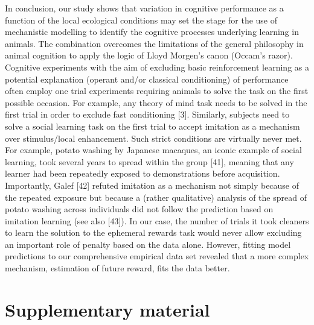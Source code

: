 \documentclass[10pt,letterpaper]{article}
\newcommand{\beginsupplement}{ \setcounter{table}{0}     \renewcommand{\thetable}{S\arabic{table}}\setcounter{figure}{0} \renewcommand{\thefigure}{S\arabic{figure}}}
\begin{document}
In conclusion, our study shows that variation in cognitive performance
as a function of the local ecological conditions may set the stage for
the use of mechanistic modelling to identify the cognitive processes
underlying learning in animals. The combination overcomes the
limitations of the general philosophy in animal cognition to apply the
logic of Lloyd Morgen's canon (Occam's razor). Cognitive experiments
with the aim of excluding basic reinforcement learning as a potential
explanation (operant and/or classical conditioning) of performance often
employ one trial experiments requiring animals to solve the task on the
first possible occasion. For example, any theory of mind task needs to
be solved in the first trial in order to exclude fast conditioning
{[}3{]}. Similarly, subjects need to solve a social learning task on the
first trial to accept imitation as a mechanism over stimulus/local
enhancement. Such strict conditions are virtually never met. For
example, potato washing by Japanese macaques, an iconic example of
social learning, took several years to spread within the group {[}41{]},
meaning that any learner had been repeatedly exposed to demonstrations
before acquisition. Importantly, Galef {[}42{]} refuted imitation as a
mechanism not simply because of the repeated exposure but because a
(rather qualitative) analysis of the spread of potato washing across
individuals did not follow the prediction based on imitation learning
(see also {[}43{]}). In our case, the number of trials it took cleaners
to learn the solution to the ephemeral rewards task would never allow
excluding an important role of penalty based on the data alone. However,
fitting model predictions to our comprehensive empirical data set
revealed that a more complex mechanism, estimation of future reward,
fits the data better.

\newpage

\hypertarget{supplementary-material}{%
\section{Supplementary material}\label{supplementary-material}}

\beginsupplement
\end{document}
